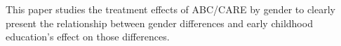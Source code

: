 \noindent This paper studies the treatment effects of ABC/CARE by gender to clearly present the relationship between gender differences and early childhood education's effect on those differences.